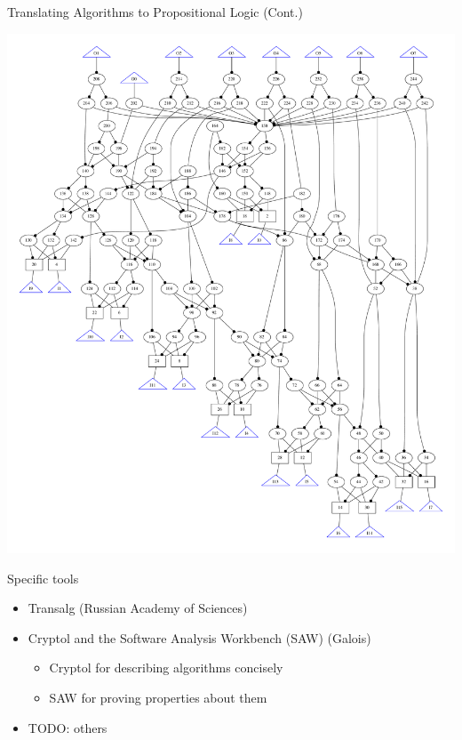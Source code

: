 \documentclass[ignorenonframetext,]{beamer}
\providecommand{\tightlist}{%
  \setlength{\itemsep}{0pt}\setlength{\parskip}{0pt}}
\begin{document}
\begin{frame}{Translating Algorithms to Propositional Logic (Cont.)}

\begin{center}
\includegraphics[height=0.8\textheight]{images/addm.pdf}
\end{center}

\end{frame}

\begin{frame}{Specific tools}

\begin{itemize}
\tightlist
\item
  Transalg (Russian Academy of Sciences) \cite{transalg}
\item
  Cryptol and the Software Analysis Workbench (SAW) (Galois)

  \begin{itemize}
  \tightlist
  \item
    Cryptol for describing algorithms concisely
  \item
    SAW for proving properties about them
  \end{itemize}
\item
  TODO: others
\end{itemize}

\end{frame}
\end{document}
